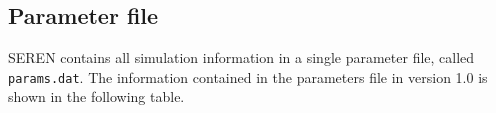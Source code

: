 \documentclass[a4paper]{article}
\newcommand{\var}[1]{\texttt{#1}}
\begin{document}

\vspace{1cm}


\newpage
\subsection{Parameter file} \label{SS:PARAMS}
SEREN contains all simulation information in a single parameter file, called \var{params.dat}.  The information contained in the parameters file in version 1.0 is shown in the following table. \newline
\end{document}
